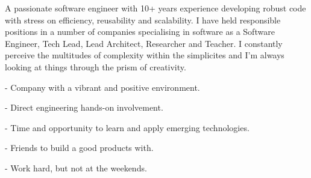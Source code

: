 \documentclass[10pt,a4paper,ragged2e,withhyper]{altacv}
\begin{document}
\vspace{0.5cm}

\begin{paracol}{2}


\begin{raggedright}
  A passionate software engineer with 10+ years experience developing
  robust code with stress on efficiency, reusability and scalability. I
  have held responsible positions in a number of companies
  specialising in software as a Software Engineer, Tech Lead, Lead Architect, Researcher and Teacher. I constantly perceive the multitudes of complexity within the simplicites and I'm always looking at things through the prism of creativity.
  \end{raggedright}


\switchcolumn


\begin{raggedright}

- Company with a vibrant and positive environment.

- Direct engineering hands-on involvement.

- Time and opportunity to learn and apply emerging technologies.

- Friends to build a good products with.

- Work hard, but not at the weekends.

\end{raggedright}



\end{paracol}

\vspace{0.5cm}


\end{document}
